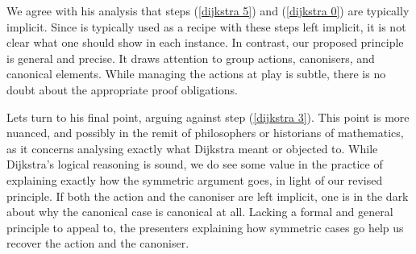 We agree with his analysis that steps (\ref{dijkstra 5}) and
(\ref{dijkstra 0}) are typically implicit. Since \WLOG{} is typically
used as a recipe with these steps left implicit, it is not clear what one should
show in each instance.  In contrast, our proposed \WLOG{} principle is
general and precise. It draws attention to group actions, canonisers,
and canonical elements. While managing the actions at play is subtle,
there is no doubt about the appropriate proof obligations.

Lets turn to his final point, arguing against step (\ref{dijkstra
  3}). This point is more nuanced, and possibly in the remit of
philosophers or historians of mathematics, as it concerns analysing
exactly what Dijkstra meant or objected to. While Dijkstra's logical
reasoning is sound, we do see some value in the practice of explaining
exactly how the symmetric argument goes, in light of our revised
\WLOG{} principle. If both the action and the canoniser are left
implicit, one is in the dark about why the canonical case is canonical
at all. Lacking a formal and general \WLOG{} principle to appeal to,
the presenters explaining how symmetric cases go help us recover the
action and the canoniser.
